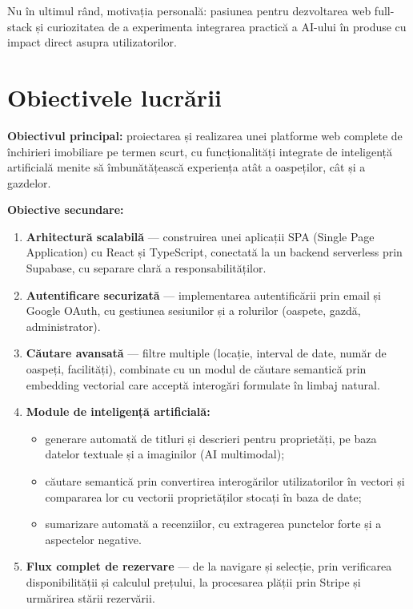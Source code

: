 \documentclass[12pt,a4paper,oneside]{report}
\begin{document}
Nu în ultimul rând, motivația personală: pasiunea pentru dezvoltarea web full-stack și curiozitatea de a experimenta integrarea practică a AI-ului în produse cu impact direct asupra utilizatorilor.


\section{Obiectivele lucrării}

\textbf{Obiectivul principal:} proiectarea și realizarea unei platforme web complete de închirieri imobiliare pe termen scurt, cu funcționalități integrate de inteligență artificială menite să îmbunătățească experiența atât a oaspeților, cât și a gazdelor.

\textbf{Obiective secundare:}

\begin{enumerate}[leftmargin=2cm]
  \item \textbf{Arhitectură scalabilă} — construirea unei aplicații SPA (Single Page Application) cu React și TypeScript, conectată la un backend serverless prin Supabase, cu separare clară a responsabilităților.

  \item \textbf{Autentificare securizată} — implementarea autentificării prin email și Google OAuth, cu gestiunea sesiunilor și a rolurilor (oaspete, gazdă, administrator).

  \item \textbf{Căutare avansată} — filtre multiple (locație, interval de date, număr de oaspeți, facilități), combinate cu un modul de căutare semantică prin embedding vectorial care acceptă interogări formulate în limbaj natural.

  \item \textbf{Module de inteligență artificială:}
  \begin{itemize}
    \item generare automată de titluri și descrieri pentru proprietăți, pe baza datelor textuale și a imaginilor (AI multimodal);
    \item căutare semantică prin convertirea interogărilor utilizatorilor în vectori și compararea lor cu vectorii proprietăților stocați în baza de date;
    \item sumarizare automată a recenziilor, cu extragerea punctelor forte și a aspectelor negative.
  \end{itemize}

  \item \textbf{Flux complet de rezervare} — de la navigare și selecție, prin verificarea disponibilității și calculul prețului, la procesarea plății prin Stripe și urmărirea stării rezervării.


\end{enumerate}
\end{document}
